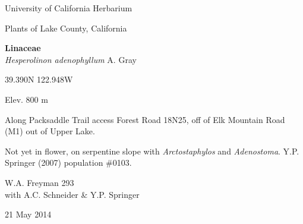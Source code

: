 \documentclass[letterpaper,10pt]{article}
\begin{document}
\begin{minipage}[t]{0.40\textwidth}

\begin{center}
University of California Herbarium \\
\begin{large}
Plants of Lake County, California \\
\end{large}
\vspace{\baselineskip}
\textbf{Linaceae} \\
\textit{Hesperolinon adenophyllum} A. Gray\\
\end{center}

\begin{footnotesize}

\begin{multicols}{2}
39.390\textdegree N 122.948\textdegree W
\columnbreak
\begin{flushright}
Elev. 800 m
\end{flushright}
\end{multicols}

Along Packsaddle Trail access Forest Road 18N25, off of Elk Mountain Road (M1) out of Upper Lake.
\vspace{\baselineskip}

Not yet in flower, on serpentine slope with \textit{Arctostaphylos} and \textit{Adenostoma}. Y.P. Springer (2007) population \#0103.

\begin{multicols}{2}
W.A. Freyman 293 \\
with A.C. Schneider \& Y.P. Springer
\columnbreak
\begin{flushright}
21 May 2014
\end{flushright}
\end{multicols}

\end{footnotesize}

\end{minipage}

\vspace{2cm}
%
%

%
%
\end{document}
